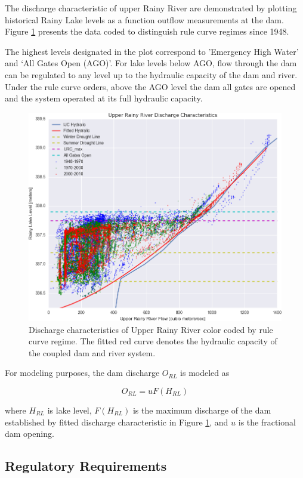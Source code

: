 \documentclass[preprint,times]{elsarticle}
\begin{document}
The discharge characteristic of upper Rainy River are demonstrated by plotting historical Rainy Lake levels as a function outflow measurements at the dam. Figure \ref{figure:RLdischarge} presents the data coded to distinguish rule curve regimes since 1948. 

The highest levels designated in the plot correspond to 'Emergency High Water' and `All Gates Open (AGO)'. For lake levels below AGO, flow through the dam can be regulated to any level up to the hydraulic capacity of the dam and river. Under the rule curve orders, above the AGO level the dam all gates are opened and the system operated at its full hydraulic capacity. 

\begin{figure}
\includegraphics[width=\linewidth]{RainyRiverDischarge_Fit}
\caption{Discharge characteristics of Upper Rainy River color coded by rule curve regime. The fitted red curve denotes the hydraulic capacity of the coupled dam and river system.}\label{figure:RLdischarge}
\end{figure}

For modeling purposes, the dam discharge $O_{RL}$ is modeled as 

$$ O_{RL} = u F(H_{RL}) $$

\noindent
where $H_{RL}$ is lake level, $F(H_{RL})$ is the maximum discharge of the dam established by fitted discharge characteristic in Figure \ref{figure:RLdischarge}, and $u$ is the fractional dam opening.

\subsection{Regulatory Requirements}
\end{document}
